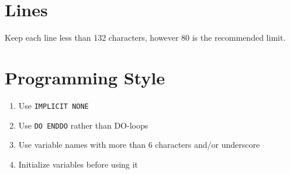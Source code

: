 \section{Lines}
\label{sec:lines}

Keep each line less than 132 characters, however 80 is the recommended
limit.

\section{Programming Style}
\label{sec:programming-style}

\begin{enumerate}
\item Use \verb!IMPLICIT NONE!
\item Use \verb!DO ENDDO! rather than DO-loops
\item Use variable names with more than 6 characters and/or underscore
\item Initialize variables before using it
\end{enumerate}


